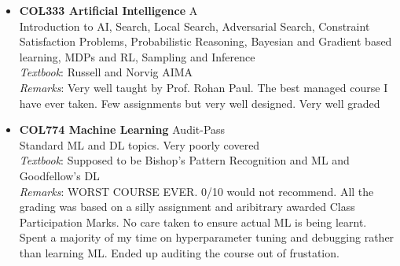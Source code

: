 \documentclass[a4paper]{article}
\begin{document}
\begin{itemize}
\item \textbf{COL333 Artificial Intelligence} {\color{red}A}
    \\
    Introduction to AI, Search, Local Search, Adversarial Search, Constraint Satisfaction Problems, Probabilistic Reasoning, Bayesian and Gradient based learning, MDPs and RL, Sampling and Inference
    \\
    \textit{Textbook}: Russell and Norvig AIMA
    \\
    \textit{Remarks}: Very well taught by Prof. Rohan Paul. The best managed course I have ever taken. Few assignments but very well designed. Very well graded

\item \textbf{COL774 Machine Learning} {\color{red}Audit-Pass}
    \\
    Standard ML and DL topics. Very poorly covered
    \\
    \textit{Textbook}: Supposed to be Bishop's Pattern Recognition and ML and Goodfellow's DL
    \\
    \textit{Remarks}: WORST COURSE EVER. 0/10 would not recommend. All the grading was based on a silly assignment and aribitrary awarded Class Participation Marks. No care taken to ensure actual ML is being learnt. Spent a majority of my time on hyperparameter tuning and debugging rather than learning ML. Ended up auditing the course out of frustation.
\end{itemize}
\end{document}
